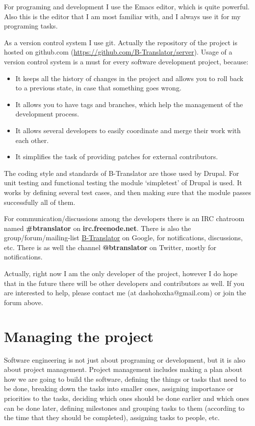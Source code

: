 \documentclass[11pt]{article}
\begin{document}
  For programing and development I use the Emacs editor, which is
  quite powerful. Also this is the editor that I am most familiar
  with, and I always use it for my programing tasks.

  As a version control system I use git. Actually the repository of
  the project is hosted on github.com
  (\href{https://github.com/B-Translator/server}{https://github.com/B-Translator/server}). Usage of a version control
  system is a must for every software development project, because:
\begin{itemize}
\item It keeps all the history of changes in the project and allows you
    to roll back to a previous state, in case that something goes
    wrong.
\item It allows you to have tags and branches, which help the management
    of the development process.
\item It allows several developers to easily coordinate and merge their
    work with each other.
\item It simplifies the task of providing patches for external
    contributors.
\end{itemize}
  The coding style and standards of B-Translator are those used by
  Drupal.  For unit testing and functional testing the module
  `simpletest' of Drupal is used. It works by defining several test
  cases, and then making sure that the module passes successfully all
  of them.

  For communication/discussions among the developers there is an IRC
  chatroom named \textbf{\#btranslator} on \textbf{irc.freenode.net}. There is also
  the group/forum/mailing-list \href{https://groups.google.com/forum/?hl=en&fromgroups#!categories/btranslator}{B-Translator} on Google, for
  notifications, discussions, etc. There is as well the channel
  \textbf{@btranslator} on Twitter, mostly for notifications.

  Actually, right now I am the only developer of the project, however
  I do hope that in the future there will be other developers and
  contributors as well. If you are interested to help, please contact
  me (at dashohoxha@gmail.com) or join the forum above.


\section{Managing the project}
\label{sec-7}


  Software engineering is not just about programing or development,
  but it is also about project management. Project management includes
  making a plan about how we are going to build the software, defining
  the things or tasks that need to be done, breaking down the tasks
  into smaller ones, assigning importance or priorities to the tasks,
  deciding which ones should be done earlier and which ones can be
  done later, defining milestones and grouping tasks to them
  (according to the time that they should be completed), assigning
  tasks to people, etc.
\end{document}
